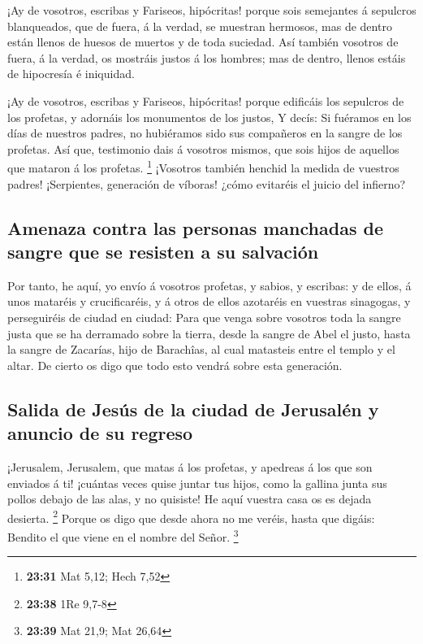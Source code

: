  ¡Ay de vosotros, escribas y Fariseos, hipócritas! porque
sois semejantes á sepulcros blanqueados, que de fuera, á la verdad, se
muestran hermosos, mas de dentro están llenos de huesos de muertos y de
toda suciedad.  Así también vosotros de fuera, á la
verdad, os mostráis justos á los hombres; mas de dentro, llenos estáis
de hipocresía é iniquidad.

 ¡Ay de vosotros, escribas y Fariseos, hipócritas! porque
edificáis los sepulcros de los profetas, y adornáis los monumentos de
los justos,  Y decís: Si fuéramos en los días de nuestros
padres, no hubiéramos sido sus compañeros en la sangre de los profetas.
 Así que, testimonio dais á vosotros mismos, que sois
hijos de aquellos que mataron á los profetas. \footnote{\textbf{23:31}
  Mat 5,12; Hech 7,52}  ¡Vosotros también henchid la
medida de vuestros padres!  ¡Serpientes, generación de
víboras! ¿cómo evitaréis el juicio del infierno?

\hypertarget{amenaza-contra-las-personas-manchadas-de-sangre-que-se-resisten-a-su-salvaciuxf3n}{%
\subsection{Amenaza contra las personas manchadas de sangre que se
resisten a su
salvación}\label{amenaza-contra-las-personas-manchadas-de-sangre-que-se-resisten-a-su-salvaciuxf3n}}

 Por tanto, he aquí, yo envío á vosotros profetas, y
sabios, y escribas: y de ellos, á unos mataréis y crucificaréis, y á
otros de ellos azotaréis en vuestras sinagogas, y perseguiréis de ciudad
en ciudad:  Para que venga sobre vosotros toda la sangre
justa que se ha derramado sobre la tierra, desde la sangre de Abel el
justo, hasta la sangre de Zacarías, hijo de Barachîas, al cual matasteis
entre el templo y el altar.  De cierto os digo que todo
esto vendrá sobre esta generación.

\hypertarget{salida-de-jesuxfas-de-la-ciudad-de-jerusaluxe9n-y-anuncio-de-su-regreso}{%
\subsection{Salida de Jesús de la ciudad de Jerusalén y anuncio de su
regreso}\label{salida-de-jesuxfas-de-la-ciudad-de-jerusaluxe9n-y-anuncio-de-su-regreso}}

 ¡Jerusalem, Jerusalem, que matas á los profetas, y
apedreas á los que son enviados á ti! ¡cuántas veces quise juntar tus
hijos, como la gallina junta sus pollos debajo de las alas, y no
quisiste!  He aquí vuestra casa os es dejada desierta.
\footnote{\textbf{23:38} 1Re 9,7-8}  Porque os digo que
desde ahora no me veréis, hasta que digáis: Bendito el que viene en el
nombre del Señor. \footnote{\textbf{23:39} Mat 21,9; Mat 26,64}

